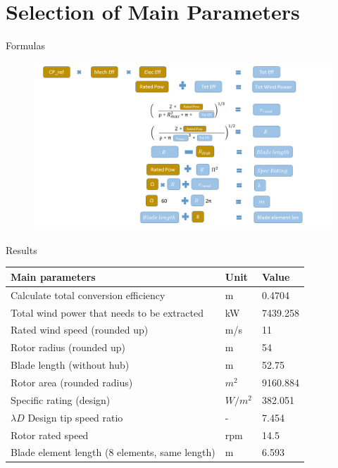 \documentclass[12pt,t]{beamer}
\begin{document}
\section{Selection of Main Parameters}

\begin{frame}
\huge 
Formulas
\begin{figure}[htbp]
\centering
\includegraphics[width=\linewidth]{figures/cip1_params.png}
\end{figure}
\end{frame}

\begin{frame}
\huge
Results
\begin{table}
\footnotesize
\centering
\begin{tabular}{ | l | l | l | }
\hline
	\textbf{Main parameters} & \textbf{Unit} & \textbf{Value} \\ \hline \hline
	Calculate total conversion efficiency & m & 0.4704 \\ \hline
	Total wind power that needs to be extracted & kW & 7439.258 \\ \hline
	Rated wind speed (rounded up) & m/s & 11 \\ \hline
	Rotor radius (rounded up) & m & 54 \\ \hline
	Blade length (without hub) & m & 52.75 \\ \hline
	Rotor area (rounded radius) & $m^2$ & 9160.884 \\ \hline
	Specific rating (design) & $W/m^2$ & 382.051 \\ \hline
	$\lambda D$ Design tip speed ratio & - & 7.454 \\ \hline
	Rotor rated speed & rpm & 14.5 \\ \hline
	Blade element length (8 elements, same length) & m & 6.593 \\ \hline
\end{tabular}
\end{table}
\end{frame}
\end{document}
